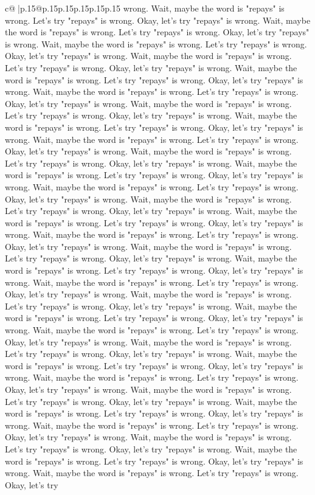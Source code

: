 \documentclass{article}
\begin{document}
{\begin{supertabular}{c@{$\;$}|p{.15\linewidth}@{}p{.15\linewidth}p{.15\linewidth}p{.15\linewidth}p{.15\linewidth}p{.15\linewidth}}
{{{wrong. Wait, maybe the word is "repays" is wrong. Let's try "repays" is wrong. Okay, let's try "repays" is wrong. Wait, maybe the word is "repays" is wrong. Let's try "repays" is wrong. Okay, let's try "repays" is wrong. Wait, maybe the word is "repays" is wrong. Let's try "repays" is wrong. Okay, let's try "repays" is wrong. Wait, maybe the word is "repays" is wrong. Let's try "repays" is wrong. Okay, let's try "repays" is wrong. Wait, maybe the word is "repays" is wrong. Let's try "repays" is wrong. Okay, let's try "repays" is wrong. Wait, maybe the word is "repays" is wrong. Let's try "repays" is wrong. Okay, let's try "repays" is wrong. Wait, maybe the word is "repays" is wrong. Let's try "repays" is wrong. Okay, let's try "repays" is wrong. Wait, maybe the word is "repays" is wrong. Let's try "repays" is wrong. Okay, let's try "repays" is wrong. Wait, maybe the word is "repays" is wrong. Let's try "repays" is wrong. Okay, let's try "repays" is wrong. Wait, maybe the word is "repays" is wrong. Let's try "repays" is wrong. Okay, let's try "repays" is wrong. Wait, maybe the word is "repays" is wrong. Let's try "repays" is wrong. Okay, let's try "repays" is wrong. Wait, maybe the word is "repays" is wrong. Let's try "repays" is wrong. Okay, let's try "repays" is wrong. Wait, maybe the word is "repays" is wrong. Let's try "repays" is wrong. Okay, let's try "repays" is wrong. Wait, maybe the word is "repays" is wrong. Let's try "repays" is wrong. Okay, let's try "repays" is wrong. Wait, maybe the word is "repays" is wrong. Let's try "repays" is wrong. Okay, let's try "repays" is wrong. Wait, maybe the word is "repays" is wrong. Let's try "repays" is wrong. Okay, let's try "repays" is wrong. Wait, maybe the word is "repays" is wrong. Let's try "repays" is wrong. Okay, let's try "repays" is wrong. Wait, maybe the word is "repays" is wrong. Let's try "repays" is wrong. Okay, let's try "repays" is wrong. Wait, maybe the word is "repays" is wrong. Let's try "repays" is wrong. Okay, let's try "repays" is wrong. Wait, maybe the word is "repays" is wrong. Let's try "repays" is wrong. Okay, let's try "repays" is wrong. Wait, maybe the word is "repays" is wrong. Let's try "repays" is wrong. Okay, let's try "repays" is wrong. Wait, maybe the word is "repays" is wrong. Let's try "repays" is wrong. Okay, let's try "repays" is wrong. Wait, maybe the word is "repays" is wrong. Let's try "repays" is wrong. Okay, let's try "repays" is wrong. Wait, maybe the word is "repays" is wrong. Let's try "repays" is wrong. Okay, let's try "repays" is wrong. Wait, maybe the word is "repays" is wrong. Let's try "repays" is wrong. Okay, let's try "repays" is wrong. Wait, maybe the word is "repays" is wrong. Let's try "repays" is wrong. Okay, let's try "repays" is wrong. Wait, maybe the word is "repays" is wrong. Let's try "repays" is wrong. Okay, let's try "repays" is wrong. Wait, maybe the word is "repays" is wrong. Let's try "repays" is wrong. Okay, let's try "repays" is wrong. Wait, maybe the word is "repays" is wrong. Let's try "repays" is wrong. Okay, let's try "repays" is wrong. Wait, maybe the word is "repays" is wrong. Let's try "repays" is wrong. Okay, let's try }}}
\end{supertabular}}
\end{document}
